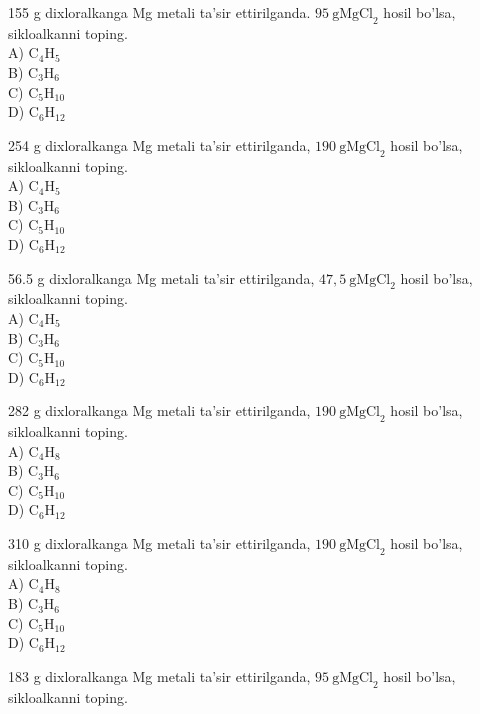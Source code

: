   \item 155 g dixloralkanga Mg metali ta'sir ettirilganda. $95 \mathrm{~g} \mathrm{MgCl}_{2}$ hosil bo'lsa, sikloalkanni toping.\\
A) $\mathrm{C}_{4} \mathrm{H}_{5}$\\
B) $\mathrm{C}_{3} \mathrm{H}_{6}$\\
C) $\mathrm{C}_{5} \mathrm{H}_{10}$\\
D) $\mathrm{C}_{6} \mathrm{H}_{12}$
  \item 254 g dixloralkanga Mg metali ta'sir ettirilganda, $190 \mathrm{~g} \mathrm{MgCl}_{2}$ hosil bo'lsa, sikloalkanni toping.\\
A) $\mathrm{C}_{4} \mathrm{H}_{5}$\\
B) $\mathrm{C}_{3} \mathrm{H}_{6}$\\
C) $\mathrm{C}_{5} \mathrm{H}_{10}$\\
D) $\mathrm{C}_{6} \mathrm{H}_{12}$
  \item 56.5 g dixloralkanga Mg metali ta'sir ettirilganda, $47,5 \mathrm{~g} \mathrm{MgCl}_{2}$ hosil bo'lsa, sikloalkanni toping.\\
A) $\mathrm{C}_{4} \mathrm{H}_{5}$\\
B) $\mathrm{C}_{3} \mathrm{H}_{6}$\\
C) $\mathrm{C}_{5} \mathrm{H}_{10}$\\
D) $\mathrm{C}_{6} \mathrm{H}_{12}$
  \item 282 g dixloralkanga Mg metali ta'sir ettirilganda, $190 \mathrm{~g} \mathrm{MgCl}_{2}$ hosil bo'lsa, sikloalkanni toping.\\
A) $\mathrm{C}_{4} \mathrm{H}_{8}$\\
B) $\mathrm{C}_{3} \mathrm{H}_{6}$\\
C) $\mathrm{C}_{5} \mathrm{H}_{10}$\\
D) $\mathrm{C}_{6} \mathrm{H}_{12}$
  \item 310 g dixloralkanga Mg metali ta'sir ettirilganda, $190 \mathrm{~g} \mathrm{MgCl}_{2}$ hosil bo'lsa, sikloalkanni toping.\\
A) $\mathrm{C}_{4} \mathrm{H}_{8}$\\
B) $\mathrm{C}_{3} \mathrm{H}_{6}$\\
C) $\mathrm{C}_{5} \mathrm{H}_{10}$\\
D) $\mathrm{C}_{6} \mathrm{H}_{12}$
  \item 183 g dixloralkanga Mg metali ta'sir ettirilganda, $95 \mathrm{~g} \mathrm{MgCl}_{2}$ hosil bo'lsa, sikloalkanni toping.\\
